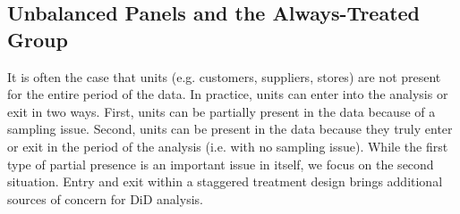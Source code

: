 \documentclass[12pt]{article}
\begin{document}
\subsection{Unbalanced Panels and the Always-Treated Group}
It is often the case that units (e.g. customers, suppliers, stores) are not present for the entire period of the data. In practice, units can enter into the analysis or exit in two ways. First, units can be partially present in the data because of a sampling issue. Second, units can be present in the data because they truly enter or exit in the period of the analysis (i.e. with no sampling issue). While the first type of partial presence is an important issue in itself, we focus on the second situation. Entry and exit within a staggered treatment design brings additional sources of concern for DiD analysis.
\end{document}
